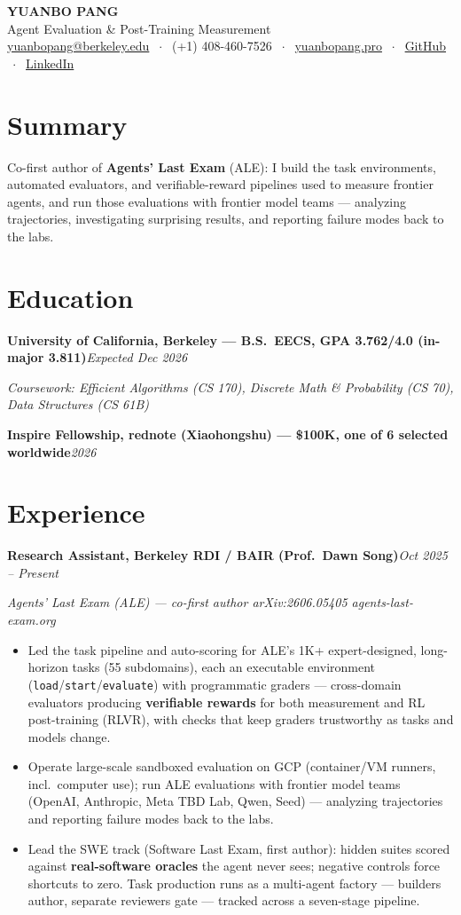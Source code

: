 \documentclass[10pt, letterpaper]{article}
\newcommand{\role}[2]{%
  \vspace{4pt}%
  \noindent\textbf{#1}\hfill\textit{#2}\par
}
\newcommand{\rolesub}[1]{%
  \noindent\textit{#1}\par\vspace{1pt}%
}
\begin{document}
\begin{center}
  {\LARGE\bfseries YUANBO PANG}\\[3pt]
  {\large Agent Evaluation \& Post-Training Measurement}\\[3pt]
  \href{mailto:yuanbopang@berkeley.edu}{yuanbopang@berkeley.edu}
  $\;\cdot\;$ (+1) 408-460-7526
  $\;\cdot\;$ \href{https://www.yuanbopang.pro}{yuanbopang.pro}
  $\;\cdot\;$ \href{https://github.com/yuanboP}{GitHub}
  $\;\cdot\;$ \href{https://www.linkedin.com/in/yuanbopang/}{LinkedIn}
\end{center}

\section{Summary}
Co-first author of \textbf{Agents' Last Exam} (ALE): I build the task environments, automated evaluators, and verifiable-reward pipelines used to measure frontier agents, and run those evaluations with frontier model teams --- analyzing trajectories, investigating surprising results, and reporting failure modes back to the labs.

\section{Education}
\role{University of California, Berkeley --- B.S.\ EECS, GPA 3.762/4.0 (in-major 3.811)}{Expected Dec 2026}
\rolesub{Coursework: Efficient Algorithms (CS 170), Discrete Math \& Probability (CS 70), Data Structures (CS 61B)}
\role{Inspire Fellowship, rednote (Xiaohongshu) --- \$100K, one of 6 selected worldwide}{2026}

\section{Experience}

\role{Research Assistant, Berkeley RDI / BAIR (Prof.\ Dawn Song)}{Oct 2025 -- Present}
\rolesub{Agents' Last Exam (ALE) --- co-first author \quad arXiv:2606.05405 \quad agents-last-exam.org}
\begin{itemize}
  \item Led the task pipeline and auto-scoring for ALE's 1K+ expert-designed, long-horizon tasks (55 subdomains), each an executable environment (\texttt{load}/\texttt{start}/\texttt{evaluate}) with programmatic graders --- cross-domain evaluators producing \textbf{verifiable rewards} for both measurement and RL post-training (RLVR), with checks that keep graders trustworthy as tasks and models change.
  \item Operate large-scale sandboxed evaluation on GCP (container/VM runners, incl.\ computer use); run ALE evaluations with frontier model teams (OpenAI, Anthropic, Meta TBD Lab, Qwen, Seed) --- analyzing trajectories and reporting failure modes back to the labs.
  \item Lead the SWE track (Software Last Exam, first author): hidden suites scored against \textbf{real-software oracles} the agent never sees; negative controls force shortcuts to zero. Task production runs as a multi-agent factory --- builders author, separate reviewers gate --- tracked across a seven-stage pipeline.
\end{itemize}
\end{document}
